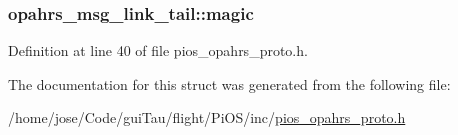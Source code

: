 \hypertarget{structopahrs__msg__link__tail_a47a2201e7c241f5553cf4a77129b3697}{
\subsubsection[{magic}]{ opahrs\-\_\-msg\-\_\-link\-\_\-tail\-::magic}}\label{structopahrs__msg__link__tail_a47a2201e7c241f5553cf4a77129b3697}


Definition at line 40 of file pios\-\_\-opahrs\-\_\-proto.\-h.



The documentation for this struct was generated from the following file\-:\begin{DoxyCompactItemize}
\item 
/home/jose/\-Code/gui\-Tau/flight/\-Pi\-O\-S/inc/\hyperlink{pios__opahrs__proto_8h}{pios\-\_\-opahrs\-\_\-proto.\-h}\end{DoxyCompactItemize}
